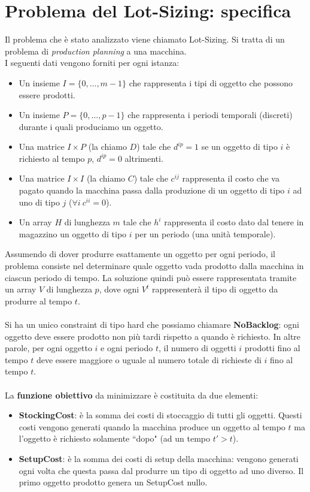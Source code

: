 \documentclass[12pt]{article}
\begin{document}
\section*{Problema del Lot-Sizing: specifica}
Il problema che è stato analizzato viene chiamato Lot-Sizing. Si tratta di un problema di \textit{production planning} a una macchina.\\
I seguenti dati vengono forniti per ogni istanza:
\begin{itemize}
\item Un insieme $I=\{0,\dots,m-1\}$ che rappresenta i tipi di oggetto che possono essere prodotti.
\item Un insieme $P=\{0,\dots,p-1\}$ che rappresenta i periodi temporali (discreti) durante i quali produciamo un oggetto.
\item Una matrice $I\times P$ (la chiamo $D$) tale che $d^{ip}=1$ se un oggetto di tipo $i$ è richiesto al tempo $p$, $d^{ip}=0$ altrimenti.
\item Una matrice $I\times I$ (la chiamo $C$) tale che $c^{ij}$ rappresenta il costo che va pagato quando la macchina passa dalla produzione di un oggetto di tipo $i$ ad uno di tipo $j$ ($\forall i\ c^{ii}=0$).
\item Un array $H$ di lunghezza $m$ tale che $h^i$ rappresenta il costo dato dal tenere in magazzino un oggetto di tipo $i$ per un periodo (una unità temporale).
\end{itemize}
Assumendo di dover produrre esattamente un oggetto per ogni periodo, il problema consiste nel determinare quale oggetto vada prodotto dalla macchina in ciascun periodo di tempo. La soluzione quindi può essere rappresentata tramite un array $V$ di lunghezza $p$, dove ogni $V^t$ rappresenterà il tipo di oggetto da produrre al tempo $t$.\\\\
Si ha un unico constraint di tipo hard che possiamo chiamare \textbf{NoBacklog}: ogni oggetto deve essere prodotto non più tardi rispetto a quando è richiesto. In altre parole, per ogni oggetto $i$ e ogni periodo $t$, il numero di oggetti $i$ prodotti fino al tempo $t$ deve essere maggiore o uguale al numero totale di richieste di $i$ fino al tempo $t$.\\\\
La \textbf{funzione obiettivo} da minimizzare è costituita da due elementi:
\begin{itemize}
\item \textbf{StockingCost}: è la somma dei costi di stoccaggio di tutti gli oggetti. Questi costi vengono generati quando la macchina produce un oggetto al tempo $t$ ma l'oggetto è richiesto solamente ``dopo" (ad un tempo $t'>t$).
\item \textbf{SetupCost}: è la somma dei costi di setup della macchina: vengono generati ogni volta che questa passa dal produrre un tipo di oggetto ad uno diverso. Il primo oggetto prodotto genera un SetupCost nullo.
\end{itemize}
\end{document}

